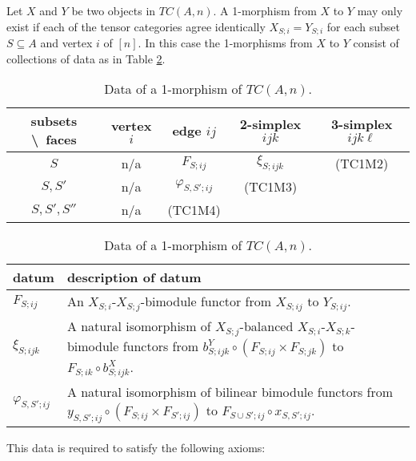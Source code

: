 \documentclass{amsart}
\begin{document}
Let $X$ and $Y$ be two objects in $TC(A,n)$. A 1-morphism from $X$ to $Y$ may only exist if each of the tensor categories agree identically $X_{S;i} = Y_{S;i}$ for each subset $S \subseteq A$ and vertex $i$ of $[n]$. In this case the 1-morphisms from $X$ to $Y$ consist of collections of data as in Table \ref{Table:1MorOfTC}.
\begin{table}[h]
	\caption{Data of a 1-morphism of $TC(A,n)$.}
	\begin{tabular}{c |cccc}
	 subsets \textbackslash\ faces & vertex $i$ & edge $ij$ & 2-simplex $ijk$ & 3-simplex $ijk\ell$  \\
	\hline
	$S$ 				& n/a & $F_{S; ij}$ & $\xi_{S; ijk}$  &  (TC1M2) \\
	$S, S'$ 			& n/a & $\varphi_{S, S';ij}$ &  (TC1M3) & \\
	$S, S', S''$ 		& n/a  & (TC1M4) & & \\
	\end{tabular}
	
	\vspace{0.5cm}
	
	\begin{tabular}{l p{11cm}}
		datum & description of datum \\ \hline
		$F_{S;ij}$ & An $X_{S;i}$-$X_{S;j}$-bimodule functor from $X_{S;ij}$ to $Y_{S;ij}$. \\
		$\xi_{S;ijk}$ & A natural isomorphism of $X_{S;j}$-balanced $X_{S;i}$-$X_{S;k}$-bimodule functors from $b^Y_{S;ijk} \circ (F_{S;ij} \times F_{S; jk})$ to $F_{S;ik} \circ b^X_{S;ijk}$. \\
		$\varphi_{S,S'; ij}$ & A natural isomorphism of bilinear bimodule functors from $y_{S,S'; ij} \circ (F_{S; ij} \times F_{S';ij})$ to $F_{S \cup S'; ij} \circ x_{S, S'; ij}$. 
	\end{tabular}
	\label{Table:1MorOfTC}
\end{table}
This data is required to satisfy the following axioms:
\end{document}
